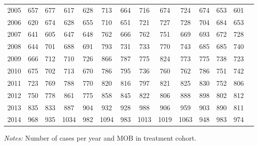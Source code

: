 \begin{table}[H]
\begin{threeparttable}
{\begin{tabular}{l*{13}{c}}
2005        &         657&         677&         617&         628&         713&         664&         716&         674&         724&         674&         653&         601\\
2006        &         620&         674&         628&         655&         710&         651&         721&         727&         728&         704&         684&         653\\
2007        &         641&         605&         647&         648&         762&         666&         762&         751&         669&         693&         672&         728\\
2008        &         644&         701&         688&         691&         793&         731&         733&         770&         743&         685&         685&         740\\
2009        &         666&         712&         710&         726&         866&         787&         775&         824&         773&         775&         738&         723\\
2010        &         675&         702&         713&         670&         786&         795&         736&         760&         762&         786&         751&         742\\
2011        &         723&         769&         788&         770&         820&         816&         797&         821&         825&         830&         752&         806\\
2012        &         750&         778&         861&         775&         858&         845&         822&         806&         888&         898&         802&         812\\
2013        &         835&         833&         887&         904&         932&         928&         988&         906&         959&         903&         890&         811\\
2014        &         968&         935&        1034&         982&        1094&         983&        1013&        1019&        1063&         948&         983&         974\\
 \bottomrule \end{tabular} } \begin{tablenotes} \item \scriptsize \emph{Notes:} Number of cases per year and MOB in treatment cohort. \end{tablenotes} \end{threeparttable} \end{table} 

